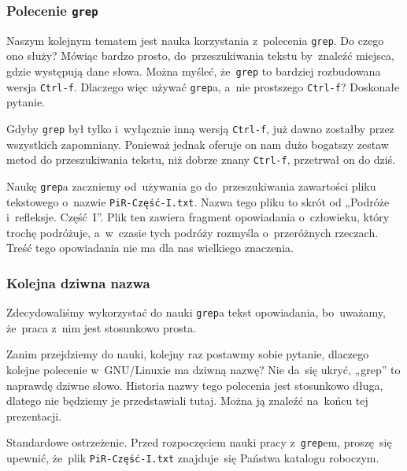 \documentclass[10pt,t]{beamer}
\begin{document}
\begin{frame}
  \frametitle{Polecenie \texttt{grep}}


  Naszym kolejnym tematem jest nauka korzystania z~polecenia \texttt{grep}.
  Do czego ono służy? Mówiąc bardzo prosto, do~przeszukiwania tekstu
  by~znaleźć miejsca, gdzie występują dane słowa. Można myśleć,
  że~\texttt{grep} to bardziej rozbudowana wersja \texttt{Ctrl-f}. Dlaczego
  więc używać \texttt{grep}a, a~nie prostszego \texttt{Ctrl-f}? Doskonałe
  pytanie.

  Gdyby \texttt{grep} był tylko i~wyłącznie inną wersją \texttt{Ctrl-f},
  już dawno zostałby przez wszystkich zapomniany. Ponieważ jednak oferuje
  on nam dużo bogatszy zestaw metod do przeszukiwania tekstu, niż dobrze
  znany \texttt{Ctrl-f}, przetrwał on do dziś.

  Naukę \texttt{grep}a zaczniemy od~używania go do~przeszukiwania
  zawartości pliku tekstowego o~nazwie \texttt{PiR-Część-I.txt}. Nazwa tego
  pliku to skrót od „Podróże i~refleksje. Część~I”. Plik ten zawiera
  fragment opowiadania o~człowieku, który trochę podróżuje, a~w~czasie tych
  podróży rozmyśla o~przeróżnych rzeczach. Treść tego opowiadania nie ma
  dla nas wielkiego znaczenia.

\end{frame}





\begin{frame}
  \frametitle{Kolejna dziwna nazwa}


  Zdecydowaliśmy wykorzystać do nauki \texttt{grep}a tekst opowiadania,
  bo~uważamy, że~praca z~nim jest stosunkowo prosta.

  Zanim przejdziemy do nauki, kolejny raz postawmy sobie pytanie, dlaczego
  kolejne polecenie w~GNU/Linuxie ma dziwną nazwę? Nie da~się ukryć, „grep”
  to naprawdę dziwne słowo. Historia nazwy tego polecenia jest stosunkowo
  długa, dlatego nie będziemy je przedstawiali tutaj. Można ją znaleźć
  na~końcu tej prezentacji.

  Standardowe ostrzeżenie. Przed rozpoczęciem nauki pracy
  z~\texttt{grep}em, proszę~się upewnić, że~plik \texttt{PiR-Część-I.txt}
  znajduje~się Państwa katalogu roboczym.

\end{frame}
\end{document}
